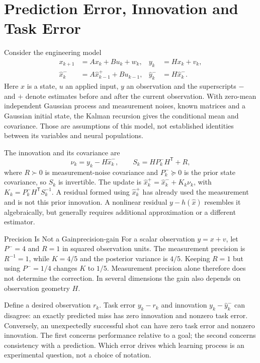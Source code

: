 \section{Prediction Error, Innovation and Task Error}

Consider the engineering model
\begin{align}
 x_{k+1}&=A x_k+B u_k+w_k, & y_k&=H x_k+v_k,\\
 \hat x^-_k&=A\hat x^+_{k-1}+B u_{k-1}, &
 \hat y^-_k&=H\hat x^-_k.
\end{align}
Here $x$ is a state, $u$ an applied input, $y$ an observation and the superscripts
$-$ and $+$ denote estimates before and after the current observation. With
zero-mean independent Gaussian process and measurement noises, known matrices
and a Gaussian initial state, the Kalman recursion gives the conditional mean
and covariance. Those are assumptions of this model, not established identities
between its variables and neural populations.

The innovation and its covariance are
\begin{equation}
 \nu_k=y_k-H\hat x^-_k,\qquad
 S_k=H P^-_k H^{\mathsf T}+R,
 \label{eq:ch5:prediction-error}
\end{equation}
where $R\succ0$ is measurement-noise covariance and $P^-_k\succeq0$ is the
prior state covariance, so $S_k$ is invertible. The update is
$\hat x^+_k=\hat x^-_k+K_k\nu_k$, with
$K_k=P^-_k H^{\mathsf T}S_k^{-1}$. A residual formed using $\hat x^+_k$ has
already used the measurement and is not this prior innovation. A nonlinear
residual $y-h(\hat x)$ resembles it algebraically, but generally requires
additional approximation or a different estimator.

\begin{example}{Precision Is Not a Gain}{precision-gain}
 For a scalar observation $y=x+v$, let $P^-=4$ and $R=1$ in squared observation
 units. The measurement precision is $R^{-1}=1$, while $K=4/5$ and the posterior
 variance is $4/5$. Keeping $R=1$ but using $P^-=1/4$ changes $K$ to $1/5$.
 Measurement precision alone therefore does not determine the correction.
 In several dimensions the gain also depends on observation geometry $H$.
\end{example}

Define a desired observation $r_k$. Task error $y_k-r_k$ and innovation
$y_k-\hat y^-_k$ can disagree: an exactly predicted miss has zero innovation
and nonzero task error. Conversely, an unexpectedly successful shot can have
zero task error and nonzero innovation. The first concerns performance relative
to a goal; the second concerns consistency with a prediction. Which error drives
which learning process is an experimental question, not a choice of notation.

